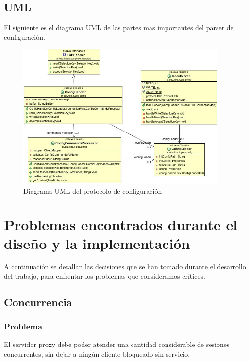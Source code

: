 \documentclass[a4paper,10pt]{article}
\begin{document}
\subsection{UML}
El siguiente es el diagrama UML de las partes mas importantes del parser de configuración.

\begin{figure}[h]
	\centering
	\includegraphics[width=400px]{ConfigUML}  
	\caption{Diagrama UML del protocolo de configuración}
	\label{figure:ConfigUML}
\end{figure}

\section{Problemas encontrados durante el diseño y la implementación}

A continuación se detallan las decisiones que se han tomado durante el desarrollo del trabajo, para enfrentar los problemas
que consideramos críticos.

\subsection{Concurrencia}
\subsubsection{Problema}
El servidor proxy debe poder atender una cantidad considerable de sesiones concurrentes, sin dejar a ningún cliente
bloqueado sin servicio.
\end{document}

